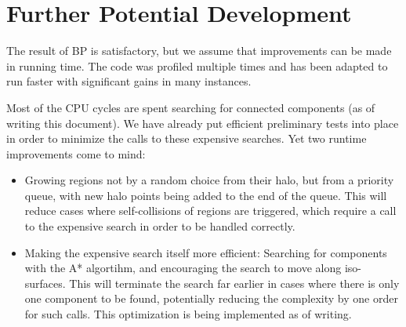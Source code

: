 \documentclass[a4paper,12pt,notitlepage,fullpage]{paper}
\theoremstyle{plain}
\theoremstyle{definition}
\begin{document}


\section{Further Potential Development}
The result of BP is satisfactory, but we assume that improvements can be made in running time.
The code was profiled multiple times and has been adapted to run faster with significant gains in many instances.

Most of the CPU cycles are spent searching for connected components (as of writing this document).
We have already put efficient preliminary tests into place in order to minimize the calls to these expensive searches.
Yet two runtime improvements come to mind:
\begin{itemize}
\item Growing regions not by a random choice from their halo, but from a priority queue, with new halo points being added to the end of the queue.
This will reduce cases where self-collisions of regions are triggered, which require a call to the expensive search in order to be handled correctly.
\item Making the expensive search itself more efficient:
Searching for components with the A* algortihm, and encouraging the search to move along iso-surfaces.
This will terminate the search far earlier in cases where there is only one component to be found, potentially reducing the complexity by one order for such calls.
This optimization is being implemented as of writing.
\end{itemize}
\end{document}
